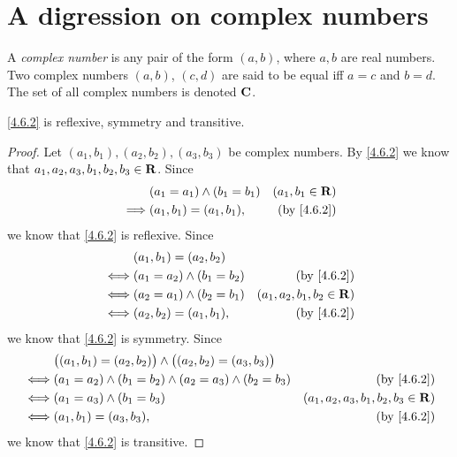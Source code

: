 \section{A digression on complex numbers}\label{sec 4.6}

\setcounter{theorem}{1}
\begin{definition}\label{4.6.2}
  A \emph{complex number} is any pair of the form \((a, b)\), where \(a, b\) are real numbers.
  Two complex numbers \((a, b)\), \((c, d)\) are said to be equal iff \(a = c\) and \(b = d\).
  The set of all complex numbers is denoted \(\mathbf{C}\).
\end{definition}

\begin{additional corollary}\label{ac 4.6.1}
\cref{4.6.2} is reflexive, symmetry and transitive.
\end{additional corollary}

\begin{proof}
  Let \((a_1, b_1), (a_2, b_2), (a_3, b_3)\) be complex numbers.
  By \cref{4.6.2} we know that \(a_1, a_2, a_3, b_1, b_2, b_3 \in \mathbf{R}\).
  Since
  \begin{align*}
             & (a_1 = a_1) \land (b_1 = b_1) & (a_1, b_1 \in \R)        \\
    \implies & (a_1, b_1) = (a_1, b_1),      & \text{(by \cref{4.6.2})}
  \end{align*}
  we know that \cref{4.6.2} is reflexive.
  Since
  \begin{align*}
         & (a_1, b_1) = (a_2, b_2)                                     \\
    \iff & (a_1 = a_2) \land (b_1 = b_2) & \text{(by \cref{4.6.2})}    \\
    \iff & (a_2 = a_1) \land (b_2 = b_1) & (a_1, a_2, b_1, b_2 \in \R) \\
    \iff & (a_2, b_2) = (a_1, b_1),      & \text{(by \cref{4.6.2})}
  \end{align*}
  we know that \cref{4.6.2} is symmetry.
  Since
  \begin{align*}
         & \big((a_1, b_1) = (a_2, b_2)\big) \land \big((a_2, b_2) = (a_3, b_3)\big)                                         \\
    \iff & (a_1 = a_2) \land (b_1 = b_2) \land (a_2 = a_3) \land (b_2 = b_3)         & \text{(by \cref{4.6.2})}              \\
    \iff & (a_1 = a_3) \land (b_1 = b_3)                                             & (a_1, a_2, a_3, b_1, b_2, b_3 \in \R) \\
    \iff & (a_1, b_1) = (a_3, b_3),                                                  & \text{(by \cref{4.6.2})}
  \end{align*}
  we know that \cref{4.6.2} is transitive.
\end{proof}

